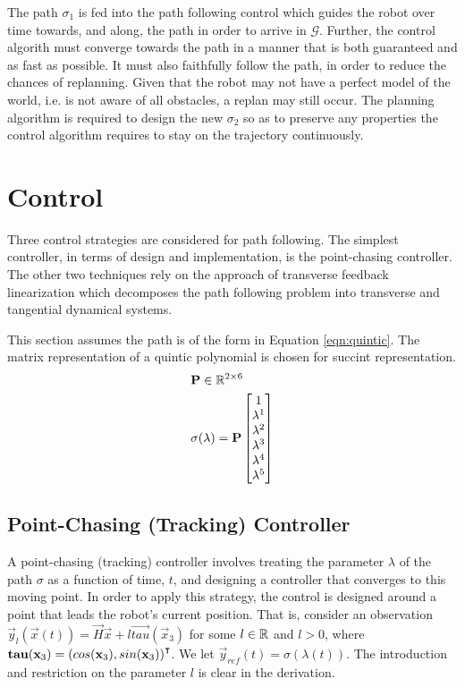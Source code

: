 \documentclass[oneside, 11pt]{book}
\begin{document}
The path $\sigma_1$ is fed into the path following control which guides the robot over time towards, and along, the path in order to arrive in $\mathcal{G}$. Further, the control algorith must converge towards the path in a manner that is both guaranteed and as fast as possible. It must also faithfully follow the path, in order to reduce the chances of replanning. Given that the robot may not have a perfect model of the world, i.e. is not aware of all obstacles, a replan may still occur. The planning algorithm is required to design the new $\sigma_2$ so as to preserve any properties the control algorithm requires to stay on the trajectory continuously.

\chapter{Control}\label{sec:control}
Three control strategies are considered for path following. The simplest controller, in terms of design and implementation, is the point-chasing controller. The other two techniques rely on the approach of transverse feedback linearization which decomposes the path following problem into transverse and tangential dynamical systems.

This section assumes the path is of the form in Equation \ref{eqn:quintic}. The matrix representation of a quintic polynomial is chosen for succint representation.
\begin{align}
    &\mathbf{P}\in\mathbb{R}^{2\times6} \nonumber \\
    &\sigma(\lambda) =   \mathbf{P}
                        \begin{bmatrix}
                            1 \\
                            \lambda^1 \\
                            \lambda^2 \\
                            \lambda^3 \\
                            \lambda^4 \\
                            \lambda^5
                        \end{bmatrix}
    \label{eqn:quintic}
\end{align}

\section{Point-Chasing (Tracking) Controller}
A point-chasing (tracking) controller involves treating the parameter $\lambda$ of the path $\sigma$ as a function of time, $t$, and designing a controller that converges to this moving point. In order to apply this strategy, the control is designed around a point that leads the robot's current position. That is, consider an observation $\vec{y}_l(\vec{x}(t)) = \vec{H}\vec{x} + l\vec{tau}(\vec{x}_3)$ for some $l\in\mathbb{R}$ and $l > 0$, where $\mathbf{tau}(\mathbf{x}_3)={(cos(\mathbf{x}_3),sin(\mathbf{x}_3))}^{\intercal}$. We let $\vec{y}_{ref}(t) = \sigma\left(\lambda(t)\right)$. The introduction and restriction on the parameter $l$ is clear in the derivation.
\end{document}
